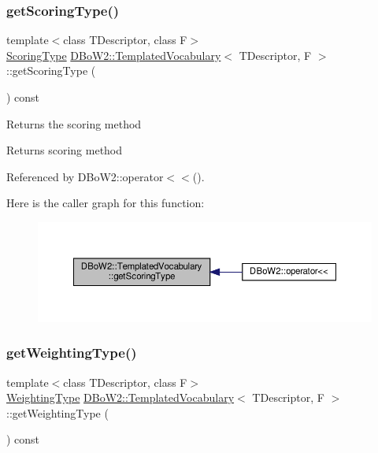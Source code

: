 \subsubsection{\texorpdfstring{get\+Scoring\+Type()}{getScoringType()}}
{\footnotesize\ttfamily template$<$class T\+Descriptor, class F$>$ \\
\hyperlink{namespaceDBoW2_aa252a592dd607c6e60dede06ceef2722}{Scoring\+Type} \hyperlink{classDBoW2_1_1TemplatedVocabulary}{D\+Bo\+W2\+::\+Templated\+Vocabulary}$<$ T\+Descriptor, F $>$\+::get\+Scoring\+Type (\begin{DoxyParamCaption}{ }\end{DoxyParamCaption}) const\hspace{0.3cm}{\ttfamily [inline]}}

Returns the scoring method \begin{DoxyReturn}{Returns}
scoring method 
\end{DoxyReturn}


Referenced by D\+Bo\+W2\+::operator$<$$<$().

Here is the caller graph for this function\+:\nopagebreak
\begin{figure}[H]
\begin{center}
\leavevmode
\includegraphics[width=350pt]{classDBoW2_1_1TemplatedVocabulary_ad830e1e3e547e5d9d45971662afca3d5_icgraph}
\end{center}
\end{figure}
\mbox{\label{classDBoW2_1_1TemplatedVocabulary_aadb9343da87e0f00ed3da401c59132b2}} 
\subsubsection{\texorpdfstring{get\+Weighting\+Type()}{getWeightingType()}}
{\footnotesize\ttfamily template$<$class T\+Descriptor, class F$>$ \\
\hyperlink{namespaceDBoW2_a5de5c8a307aca9a84ffefda2a9bc467a}{Weighting\+Type} \hyperlink{classDBoW2_1_1TemplatedVocabulary}{D\+Bo\+W2\+::\+Templated\+Vocabulary}$<$ T\+Descriptor, F $>$\+::get\+Weighting\+Type (\begin{DoxyParamCaption}{ }\end{DoxyParamCaption}) const\hspace{0.3cm}{\ttfamily [inline]}}

